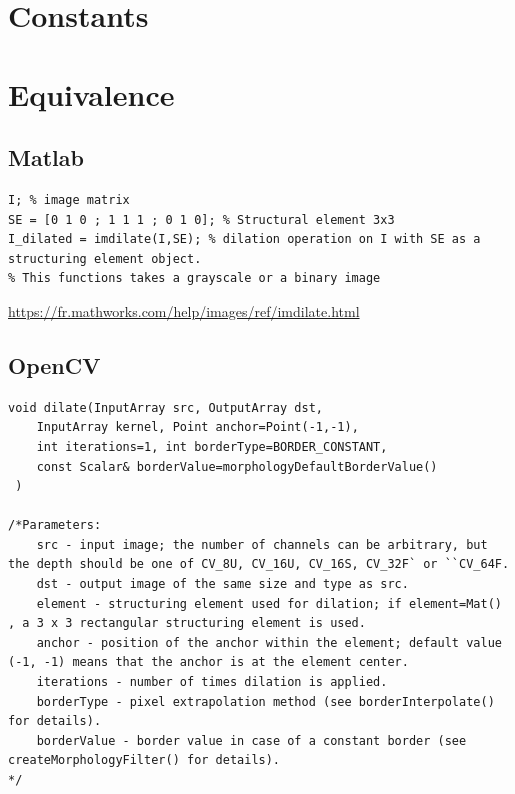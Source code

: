 \documentclass[12pt,a4paper]{article}
\begin{document}
\vspace{0.5cm}

\section*{Constants}




\section*{Equivalence}
\subsection*{Matlab}

\lstset{language=Matlab}
\begin{lstlisting}
I; % image matrix
SE = [0 1 0 ; 1 1 1 ; 0 1 0]; % Structural element 3x3
I_dilated = imdilate(I,SE); % dilation operation on I with SE as a structuring element object.
% This functions takes a grayscale or a binary image

\end{lstlisting}

\url{https://fr.mathworks.com/help/images/ref/imdilate.html}


\subsection*{OpenCV}

\lstset{language=C++}
\begin{lstlisting}
void dilate(InputArray src, OutputArray dst, 
	InputArray kernel, Point anchor=Point(-1,-1), 
	int iterations=1, int borderType=BORDER_CONSTANT, 
	const Scalar& borderValue=morphologyDefaultBorderValue()
 )

/*Parameters:	
    src - input image; the number of channels can be arbitrary, but the depth should be one of CV_8U, CV_16U, CV_16S, CV_32F` or ``CV_64F.
    dst - output image of the same size and type as src.
    element - structuring element used for dilation; if element=Mat() , a 3 x 3 rectangular structuring element is used.
    anchor - position of the anchor within the element; default value (-1, -1) means that the anchor is at the element center.
    iterations - number of times dilation is applied.
    borderType - pixel extrapolation method (see borderInterpolate() for details).
    borderValue - border value in case of a constant border (see createMorphologyFilter() for details).
*/
\end{lstlisting}
\end{document}
